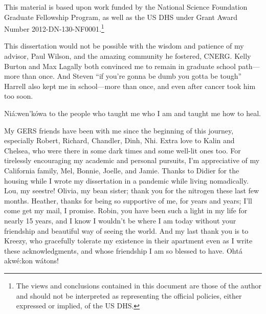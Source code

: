 This material is based upon work funded by the National Science Foundation Graduate
Fellowship Program, as well as the \gls{US} \gls{DHS} under Grant Award Number
2012-DN-130-NF0001.\footnote{The views and conclusions contained in this
document are those of the author and should not be interpreted as representing
the official policies, either expressed or implied, of the \gls{US} \gls{DHS}.} 

This dissertation would not be possible with the wisdom and patience of my
advisor, Paul Wilson, and the amazing community he fostered, CNERG. Kelly
Burton and Max Lagally both convinced me to remain in graduate school
path---more than once. And Steven ``if you're gonna be dumb you gotta be
tough'' Harrell also kept me in school---more than once, and even after cancer
took him too soon.  

Ni\'{a}:wen'k\'{o}wa to the people who taught me who I am and taught me how to
heal. 

My GERS friends have been with me since the beginning of this journey,
especially Robert, Richard, Chandler, Dinh, Nhi. Extra love to Kalin and
Chelsea, who were there in some dark times and some well-lit ones too.  For
tirelessly encouraging my academic and personal pursuits, I'm appreciative of
my California family, Mel, Bonnie, Joelle, and Jamie.  Thanks to Didier for the
housing while I wrote my dissertation in a pandemic while living nomadically.
Lou, my seestre!  Olivia, my bean sister; thank you for the nitrogen these last
few months.  Heather, thanks for being so supportive of me, for years and
years; I'll come get my mail, I promise.  Robin, you have been such a light in
my life for nearly 15 years, and I know I wouldn't be where I am today without
your friendship and beautiful way of seeing the world. And my last thank you is
to Kreezy, who gracefully tolerate my existence in their apartment even as I
write these acknowledgments, and whose friendship I am so blessed to have.
Oht\'{a} akw\'{e}:kon w\'{a}tons!

